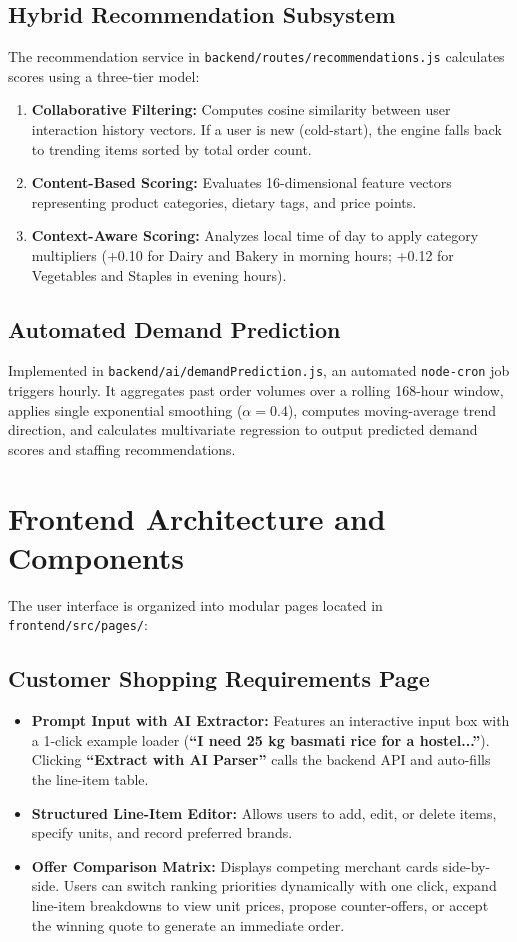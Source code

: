 \subsection{Hybrid Recommendation Subsystem}
The recommendation service in \texttt{backend/routes/recommendations.js} calculates scores using a three-tier model:
\begin{enumerate}
    \item \textbf{Collaborative Filtering:} Computes cosine similarity between user interaction history vectors. If a user is new (cold-start), the engine falls back to trending items sorted by total order count.
    \item \textbf{Content-Based Scoring:} Evaluates 16-dimensional feature vectors representing product categories, dietary tags, and price points.
    \item \textbf{Context-Aware Scoring:} Analyzes local time of day to apply category multipliers (+0.10 for Dairy and Bakery in morning hours; +0.12 for Vegetables and Staples in evening hours).
\end{enumerate}

\subsection{Automated Demand Prediction}
Implemented in \texttt{backend/ai/demandPrediction.js}, an automated \texttt{node-cron} job triggers hourly. It aggregates past order volumes over a rolling 168-hour window, applies single exponential smoothing ($\alpha = 0.4$), computes moving-average trend direction, and calculates multivariate regression to output predicted demand scores and staffing recommendations.

\section{Frontend Architecture and Components}

The user interface is organized into modular pages located in \texttt{frontend/src/pages/}:

\subsection{Customer Shopping Requirements Page}
\begin{itemize}
    \item \textbf{Prompt Input with AI Extractor:} Features an interactive input box with a 1-click example loader (\textbf{``I need 25 kg basmati rice for a hostel...''}). Clicking \textbf{``Extract with AI Parser''} calls the backend API and auto-fills the line-item table.
    \item \textbf{Structured Line-Item Editor:} Allows users to add, edit, or delete items, specify units, and record preferred brands.
    \item \textbf{Offer Comparison Matrix:} Displays competing merchant cards side-by-side. Users can switch ranking priorities dynamically with one click, expand line-item breakdowns to view unit prices, propose counter-offers, or accept the winning quote to generate an immediate order.
\end{itemize}

